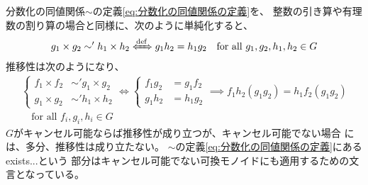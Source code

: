 {	\begin{note}[分数化の同値関係とキャンセル可能性]
	\label{note:分数化の同値関係とキャンセル可能性} %
	分数化の同値関係$\sim$の定義\eqref{eq:分数化の同値関係の定義}を、
	整数の引き算や有理数の割り算の場合と同様に、次のように単純化すると、
	\begin{equation*}\begin{split}
		g_1\times g_2 \sim' h_1\times h_2 \xiff{\dfn} g_1h_2 = h_1g_2
		\quad\text{for all } g_1,g_2,h_1,h_2\in G
	\end{split}\end{equation*}
	推移性は次のようになり、
	\begin{equation*}\begin{split}
		\left\{\begin{split}
			f_1\times f_2 &\sim' g_1\times g_2 \\
			g_1\times g_2 &\sim' h_1\times h_2
		\end{split}\right.\iff \left\{\begin{split}
			f_1g_2 &= g_1f_2 \\
			g_1h_2 &= h_1g_2
		\end{split}\right. \implies f_1h_2(g_1g_2) = h_1f_2(g_1g_2) \\
		\quad\text{for all } f_i,g_i,h_i\in G
	\end{split}\end{equation*}
	$G$がキャンセル可能ならば推移性が成り立つが、キャンセル可能でない場合
	には、多分、推移性は成り立たない。
	$\sim$の定義\eqref{eq:分数化の同値関係の定義}にあるexists...という
	部分はキャンセル可能でない可換モノイドにも適用するための文言となっている。
	\EOP
	\end{note} %

}
